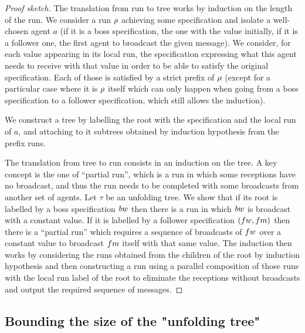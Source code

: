 \begin{proof}[Proof sketch]
The translation from run to tree works by induction on the length of the run. We consider a run $\rho$ achieving some specification and isolate a well-chosen agent $a$ (if it is a boss specification, the one with the value initially, if it is a follower one, the first agent to broadcast the given message). We consider, for each value appearing in its local run, the specification expressing what this agent needs to receive with that value in order to be able to satisfy the original specification. 
Each of those is satisfied by a strict prefix of $\rho$ (except for a particular case where it is $\rho$ itself which can only happen when going from a boss specification to a follower specification, which still allows the induction).

We construct a tree by labelling the root with the specification and the local run of $a$, and attaching to it subtrees obtained by induction hypothesis from the prefix runs.

The translation from tree to run consists in an induction on the tree. A key concept is the one of ``partial run'', which is a run in which some receptions have no broadcast, and thus the run needs to be completed with some broadcasts from another set of agents.
 Let $\tau$ be an unfolding tree. We show that if its root is labelled by a boss specification $\bossspec$ then there is a run in which $\bossspec$ is broadcast with a constant value. If it is labelled by a follower specification $(\followwordspec, \followmessagespec)$ then there is a ``partial run'' which requires a sequence of broadcasts of $\followwordspec$ over a constant value to broadcast $\followmessagespec$ itself with that same value.
 The induction then works by considering the runs obtained from the children of the root by induction hypothesis and then constructing a run using a parallel composition of those runs with the local run label of the root to eliminate the receptions without broadcasts and output the required sequence of messages. 
\end{proof}



\subsection{Bounding the size of the "unfolding tree"}
\label{sec:tree-bounds}

